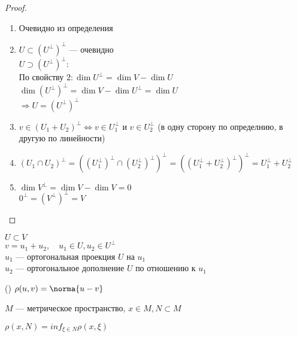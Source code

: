 \begin{theorem}
\begin{proof}
\begin{enumerate}
            \item Очевидно из определения
            \item $U \subset (U^{\perp})^{\perp}$ --- очевидно \\
            $U \supset (U^{\perp})^{\perp}:$ \\
            По свойству $2: \dim U^{\perp} = \dim V - \dim U$ \\
            $\dim (U^{\perp})^{\perp} = \dim V - \dim U^{\perp} = \dim U$ \\
            $\Longrightarrow U = (U^{\perp})^{\perp}$
            \item $v \in (U_1 + U_2)^{\perp} \Longleftrightarrow v \in U_1^{\perp}$ и $v \in U_2^{\perp}$ (в одну сторону по определнию, в другую по линейности)
            \item $(U_1 \cap U_2)^{\perp} = ((U_1^{\perp})^{\perp} \cap (U_2^{\perp})^{\perp})^{\perp} = ((U_1^{\perp} + U_2^{\perp})^{\perp})^{\perp} = U_1^{\perp} + U_2^{\perp}$
            \item $\dim V^{\perp} = \dim V - \dim V = 0$ \\
            $0^{\perp} = (V^{\perp})^{\perp} = V$
        \end{enumerate}
    \end{proof}
\end{theorem}

\begin{conj}
    $U \subset V$ \\
    $v = u_1 + u_2, \quad u_1 \in U, u_2 \in U^{\perp}$ \\
    $u_1$ --- ортогональная проекция $U$ на $u_1$ \\
    $u_2$ --- ортогональное дополнение $U$ по отношению к $u_1$ \\
\end{conj}

\begin{theorem}()
    $\rho(u, v) = \norma{u - v}$

    $M$ --- метрическое пространство, $x \in M, N \subset M$

    $\rho(x, N) = inf_{\xi \in N} \rho(x, \xi)$ 
\end{theorem}

